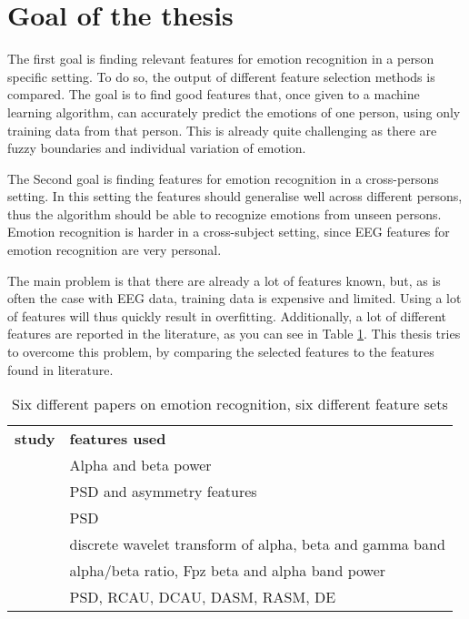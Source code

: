 \section{Goal of the thesis}
The first goal is finding relevant features for emotion recognition in a person specific setting. To do so, the output of different feature selection methods is compared. The goal is to find good features that, once given to a machine learning algorithm, can accurately predict the emotions of one person, using only training data from that person. This is already quite challenging as there are fuzzy boundaries and individual variation of emotion\citep{emorecoghard}.

\npar

The Second goal is finding features for emotion recognition in a cross-persons setting. In this setting the features should generalise well across different persons, thus the algorithm should be able to recognize emotions from unseen persons. Emotion recognition is harder in a cross-subject setting, since EEG features for emotion recognition are very personal\citep{DEAP}.

\npar

The main problem is that there are already a lot of features known, but, as is often the case with EEG data, training data is expensive and limited. Using a lot of features will thus quickly result in overfitting. Additionally, a lot of different features are reported in the literature, as you can see in Table \ref{diffFeat}. This thesis tries to overcome this problem, by comparing the selected features to the features found in literature.

\begin{table}[]
\centering
\caption{Six different papers on emotion recognition, six different feature sets}
\label{diffFeat}
\begin{tabular}{ll}
\textbf{study} & \textbf{features used}                         \\
\citep{ref4}     & Alpha and beta power                           \\
\citep{ref7}     & PSD and asymmetry features                     \\
\citep{ref8}     & PSD                                            \\
\citep{ref6}     & discrete wavelet transform of alpha, beta and gamma band \\
\citep{ExtendedPaper}	&	alpha/beta ratio, Fpz beta and alpha band power \\
\citep{killyPaper} & PSD, RCAU, DCAU, DASM, RASM, DE \\
\end{tabular}
\end{table}

